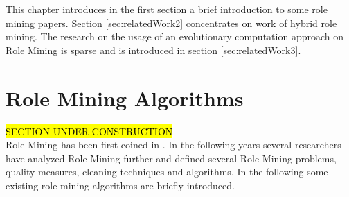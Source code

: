 This chapter introduces in the first section a brief introduction to some role mining papers. Section \ref{sec:relatedWork2} concentrates on work of hybrid role mining. The research on the usage of an evolutionary computation approach on Role Mining is sparse and is introduced in section \ref{sec:relatedWork3}. 

\section{Role Mining Algorithms}
\hl{SECTION UNDER CONSTRUCTION}\\
Role Mining has been first coined in \cite{Kuhlmann}. In the following years several researchers have analyzed Role Mining further and defined several Role Mining problems, quality measures, cleaning techniques and algorithms. In the following some existing role mining algorithms are briefly introduced.\\
